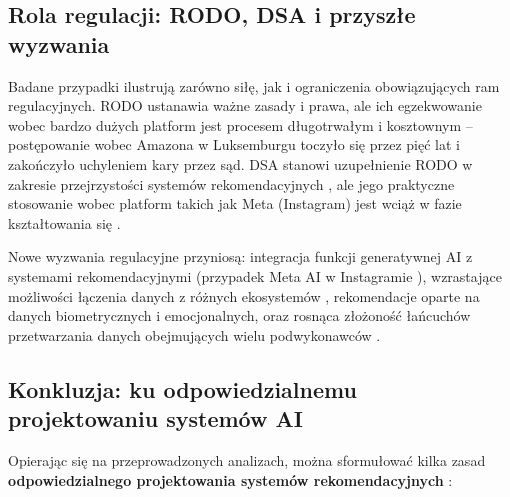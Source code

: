 \documentclass[12pt, a4paper]{article}
\begin{document}
\subsection{Rola regulacji: RODO, DSA i przyszłe wyzwania}

Badane przypadki ilustrują zarówno siłę, jak i ograniczenia obowiązujących ram regulacyjnych. RODO \cite{rodo} ustanawia ważne zasady i prawa, ale ich egzekwowanie wobec bardzo dużych platform jest procesem długotrwałym i kosztownym -- postępowanie wobec Amazona w Luksemburgu toczyło się przez pięć lat i zakończyło uchyleniem kary przez sąd. DSA \cite{dsa} stanowi uzupełnienie RODO w zakresie przejrzystości systemów rekomendacyjnych \cite{ec_dsa}, ale jego praktyczne stosowanie wobec platform takich jak Meta (Instagram) jest wciąż w fazie kształtowania się \cite{ec_meta_dsa, reuters_ie}.

Nowe wyzwania regulacyjne przyniosą: integracja funkcji generatywnej AI z systemami rekomendacyjnymi (przypadek Meta AI w Instagramie \cite{meta_ai}), wzrastające możliwości łączenia danych z różnych ekosystemów \cite{himeur2022}, rekomendacje oparte na danych biometrycznych i emocjonalnych, oraz rosnąca złożoność łańcuchów przetwarzania danych obejmujących wielu podwykonawców \cite{rodo}.

\subsection{Konkluzja: ku odpowiedzialnemu projektowaniu systemów AI}

Opierając się na przeprowadzonych analizach, można sformułować kilka zasad \textbf{odpowiedzialnego projektowania systemów rekomendacyjnych} \cite{edpb2019, chen2025}:
\end{document}
